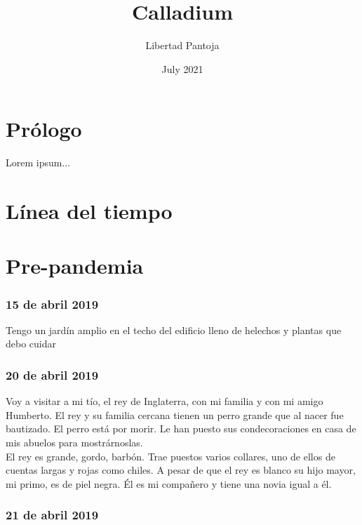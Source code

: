 \documentclass[12pt]{book}
\title{Calladium}
\author{Libertad Pantoja}
\date{July 2021}
\begin{document}
\maketitle

\tableofcontents


\chapter{Prólogo}
Lorem ipsum...

\chapter{Línea del tiempo}

\startchronology
\startchronology
[startyear=2019,stopyear=2021]
\stopchronology


\chapter{Pre-pandemia}

\subsection*{\hfill 15 de abril 2019}

Tengo un jardín amplio en el techo del edificio lleno de helechos y plantas que debo cuidar

\subsection*{\hfill 20 de abril 2019}

Voy a visitar a mi tío, el rey de Inglaterra, con mi familia y con mi amigo Humberto. El rey y su familia cercana tienen un perro grande que al nacer fue bautizado. El perro está por morir. Le han puesto sus condecoraciones en casa de mis abuelos para mostrárnoslas.
\\
El rey es grande, gordo, barbón. Trae puestos varios collares, uno de ellos de cuentas largas y rojas como chiles. A pesar de que el rey es blanco su hijo mayor, mi primo, es de piel negra. Él es mi compañero y tiene una novia igual a él.

\subsection*{\hfill 21 de abril 2019}
\end{document}
